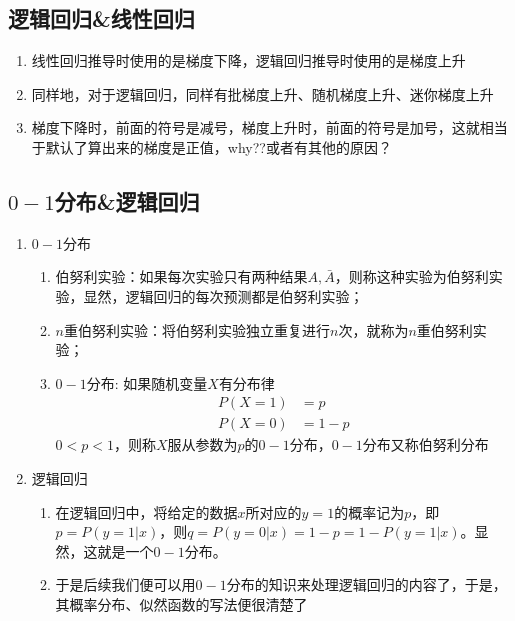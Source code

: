 \begin{enumerate}
\begin{enumerate}
\begin{enumerate}
		\end{enumerate}
	\end{enumerate}

\end{enumerate}

\subsection{逻辑回归\&线性回归}
\begin{enumerate}
	\item 线性回归推导时使用的是梯度下降，逻辑回归推导时使用的是梯度上升
	\item 同样地，对于逻辑回归，同样有批梯度上升、随机梯度上升、迷你梯度上升
	\item 梯度下降时，前面的符号是减号，梯度上升时，前面的符号是加号，这就相当于默认了算出来的梯度是正值，why??或者有其他的原因？
\end{enumerate}


\subsection{$0-1$分布\&逻辑回归}
{\color{red}{以下内容正确性待验证}}
\begin{enumerate}
	\item $0-1$分布
	\begin{enumerate}
		\item 伯努利实验：如果每次实验只有两种结果$A, \bar A$，则称这种实验为伯努利实验，显然，逻辑回归的每次预测都是伯努利实验；
		\item $n$重伯努利实验：将伯努利实验独立重复进行$n$次，就称为$n$重伯努利实验；
		\item $0-1$分布: 如果随机变量$X$有分布律
		\begin{align}
			P(X=1) &= p \\
			P(X=0) &= 1-p
		\end{align}
		$0<p<1$，则称$X$服从参数为$p$的$0-1$分布，$0-1$分布又称伯努利分布
	\end{enumerate}

	\item 逻辑回归
	\begin{enumerate}
		\item 在逻辑回归中，将给定的数据$x$所对应的$y=1$的概率记为$p$，即$p=P(y=1|x)$，则$q=P(y=0|x)=1-p=1-P(y=1|x)$。显然，这就是一个$0-1$分布。
		\item 于是后续我们便可以用$0-1$分布的知识来处理逻辑回归的内容了，于是，其概率分布、似然函数的写法便很清楚了
	\end{enumerate}
\end{enumerate}






















